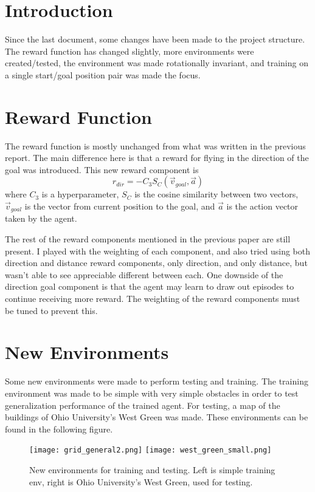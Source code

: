 \section{Introduction}
    Since the last document, some changes have been made to the project structure. The reward function has
    changed slightly, more environments were created/tested, the environment was made rotationally invariant,
    and training on a single start/goal position pair was made the focus.

\section{Reward Function}
    The reward function is mostly unchanged from what was written in the previous report. The main difference here
    is that a reward for flying in the direction of the goal was introduced. This new reward component is
    \begin{equation}
        r_{dir} = -C_3 S_C(\vec{v}_{goal}, \vec{a})
    \end{equation}
    where $C_3$ is a hyperparameter, $S_C$ is the cosine similarity between two vectors, $\vec{v}_{goal}$ is the
    vector from current position to the goal, and $\vec{a}$ is the action vector taken by the agent.

    The rest of the reward components mentioned in the previous paper are still present. I played with the weighting
    of each component, and also tried using both direction and distance reward components, only direction, and only
    distance, but wasn't able to see appreciable different between each. One downside of the direction goal component
    is that the agent may learn to draw out episodes to continue receiving more reward. The weighting of the reward
    components must be tuned to prevent this.

\section{New Environments}
    Some new environments were made to perform testing and training. The training environment was made to be simple
    with very simple obstacles in order to test generalization performance of the trained agent. For testing, a map
    of the buildings of Ohio University's West Green was made. These environments can be found in the following figure.

    \begin{figure}[H]
        \centering
            \texttt{[image: grid\_general2.png]}
            \texttt{[image: west\_green\_small.png]}
            \caption{New environments for training and testing. Left is simple training env, right is Ohio University's
                     West Green, used for testing.}
            \label{fig:environments}
    \end{figure}


